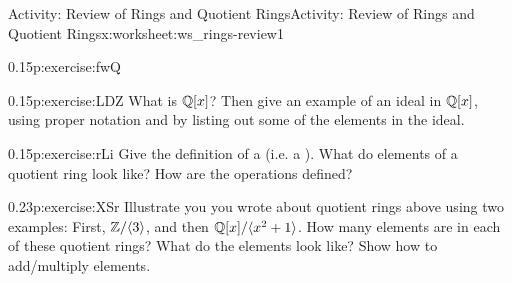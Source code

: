 \documentclass[11pt]{book}
\begin{document}
\begin{worksheet-subsection}{Activity: Review of Rings and Quotient Rings}{}{Activity: Review of Rings and Quotient Rings}{}{}{x:worksheet:ws_rings-review1}
\begin{divisionexercise}{6}{}{0.15}{p:exercise:fwQ}
\end{divisionexercise}%
\begin{divisionexercise}{7}{}{0.15}{p:exercise:LDZ}%
What is \(\mathbb{Q}[x]\)?  Then give an example of an ideal in \(\mathbb{Q}[x]\), using proper notation and by listing out some of the elements in the ideal.%
\end{divisionexercise}%
\begin{divisionexercise}{8}{}{0.15}{p:exercise:rLi}%
Give the definition of a  (i.e. a ).  What do elements of a quotient ring look like?  How are the operations defined?%
\end{divisionexercise}%
\begin{divisionexercise}{9}{}{0.23}{p:exercise:XSr}%
Illustrate you you wrote about quotient rings above using two examples: First, \(\mathbb{Z}/\langle 3 \rangle\), and then \(\mathbb{Q}[x]/\langle x^2 + 1\rangle\).  How many elements are in each of these quotient rings?  What do the elements look like?  Show how to add\slash{}multiply elements.%
\end{divisionexercise}%
\end{worksheet-subsection}
\restoregeometry
\end{document}
